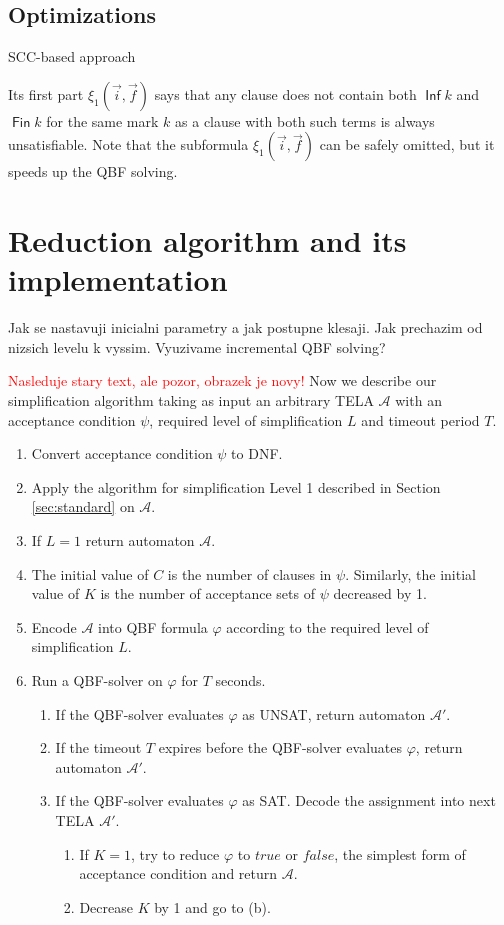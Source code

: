 \documentclass[a4paper,UKenglish,cleveref, autoref, thm-restate]{lipics-v2021}
\newcommand{\todo}[1]{\textcolor{red}{#1}}
\DeclareMathOperator{\Inf}{\mathsf{Inf}}
\DeclareMathOperator{\Fin}{\mathsf{Fin}}
\def\false{\mathit{false}}
\def\true{\mathit{true}}
\begin{document}
\subsection{Optimizations}

SCC-based approach

Its first part $\xi_1(\vec{i},\vec{f})$ says that any clause does not
contain both $\Inf k$ and $\Fin k$ for the same mark $k$ as a clause
with both such terms is always unsatisfiable. Note that the subformula
$\xi_1(\vec{i},\vec{f})$ can be safely omitted, but it speeds up the QBF solving.



\section{Reduction algorithm and its implementation}\label{sec:algimpl}
Jak se nastavuji inicialni parametry a jak postupne klesaji.
Jak prechazim od nizsich levelu k vyssim.
Vyuzivame incremental QBF solving?

\todo{Nasleduje stary text, ale pozor, obrazek je novy!}
Now we describe our simplification algorithm taking as input an arbitrary TELA $\mathcal{A}$ with an acceptance condition $\psi$, required level of simplification $L$ and timeout period $T$.
\begin{enumerate}
    \item Convert acceptance condition $ \psi$ to DNF.
    \item Apply the algorithm for simplification Level 1 described in Section \ref{sec:standard} on $\mathcal{A}$.
    \item If $L = 1$ return automaton $\mathcal{A}$.
     \item The initial value of $C$ is the number of clauses in $\psi$. Similarly, the initial value of $K$ is the number of acceptance sets of $\psi$ decreased by 1.
    \item Encode $\mathcal{A}$ into QBF formula $\varphi$ according to the required level of simplification $L$.
    \item Run a QBF-solver on $\varphi$ for $T$ seconds.
    \begin{enumerate}
        \item If the QBF-solver evaluates $\varphi$ as UNSAT, return automaton $\mathcal{A}'$.
        \item If the timeout $T$ expires before the QBF-solver evaluates $\varphi$, return automaton $\mathcal{A}'$.
        \item If the QBF-solver evaluates $\varphi$ as SAT. Decode the assignment into next TELA $\mathcal{A}'$.
        \begin{enumerate}
            \item If $K=1$, try to reduce $\varphi$ to $\true$ or $\false$, the simplest form of acceptance condition and return $\mathcal{A}$.
            \item Decrease $K$ by 1 and go to (b).
        
    \end{enumerate}
        
    \end{enumerate}
\end{enumerate}
\end{document}
